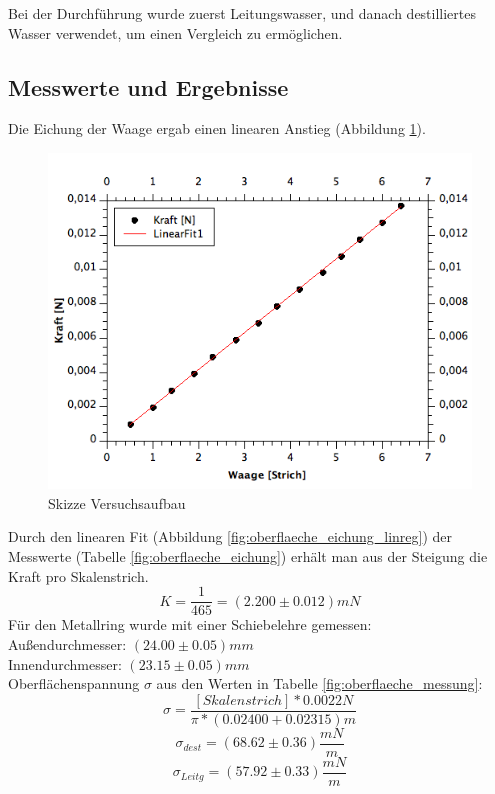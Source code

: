 \documentclass[12pt,a4paper]{article}
\begin{document}
\begin{multicols}{2}
\noindent Bei der Durchführung wurde zuerst Leitungswasser, und danach destilliertes Wasser verwendet, um einen Vergleich zu ermöglichen.

\subsection{Messwerte und Ergebnisse}
Die Eichung der Waage ergab einen linearen Anstieg (Abbildung \ref{fig:oberflaeche_eichung_fit}). 

\begin{figure}[H]
	\centering
	\includegraphics[scale=0.45]{./figure/Waageneichung-Fit_02.png}
	\caption{Skizze Versuchsaufbau}
	\label{fig:oberflaeche_eichung_fit}
\end{figure}




\noindent
Durch den linearen Fit (Abbildung \ref{fig:oberflaeche_eichung_linreg}) der Messwerte (Tabelle \ref{fig:oberflaeche_eichung}) erhält man aus der Steigung die Kraft pro Skalenstrich. 
$$K = \frac{1}{465} = (2.200\pm 0.012)mN$$ 
Für den Metallring wurde mit einer Schiebelehre gemessen:\\
Außendurchmesser: $(24.00 \pm 0.05)mm$\\
Innendurchmesser: $(23.15 \pm 0.05)mm$\\
Oberflächenspannung $\sigma$ aus den Werten in Tabelle \ref{fig:oberflaeche_messung}:
$$\sigma = \frac{[Skalenstrich] * 0.0022N}{\pi * (0.02400 + 0.02315)m} $$ 
$$\sigma_{dest}= (68.62 \pm 0.36) \frac{mN}{m}$$ %
$$ \sigma_{Leitg} = (57.92 \pm 0.33) \frac{mN}{m}$$




\end{multicols}
\end{document}
